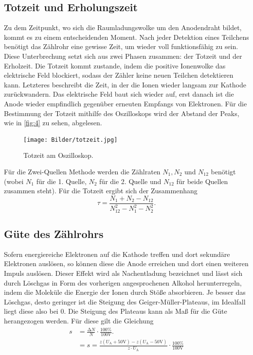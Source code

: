 \subsection{Totzeit und Erholungszeit}
Zu dem Zeitpunkt, wo sich die Raumladungswolke um den Anodendraht bildet, kommt 
es zu einem entscheidenden Moment. Nach jeder Detektion eines Teilchens benötigt
das Zählrohr eine gewisse Zeit, um wieder voll funktionsfähig zu sein. Diese
Unterbrechung setzt sich aus zwei Phasen zusammen: der Totzeit und der Erholzeit.
Die Totzeit kommt zustande, indem die positive Ionenwolke das elektrische Feld 
blockiert, sodass der Zähler keine neuen Teilchen detektieren kann. Letzteres 
beschreibt die Zeit, in der die Ionen wieder langsam zur Kathode zurückwandern. 
Das elektrische Feld baut sich wieder auf, erst danach ist die Anode wieder 
empfindlich gegenüber erneuten Empfangs von Elektronen. Für die Bestimmung der 
Totzeit mithilfe des Oszilloskops wird der Abstand der Peaks, wie in \autoref{fig:4}
zu sehen, abgelesen.
\begin{figure}[H]
    \centering
        \centering
        \texttt{[image: Bilder/totzeit.jpg]}
        \caption{Totzeit am Oszilloskop.}
    \hfill
    \label{fig:3}
\end{figure}
\noindent Für die Zwei-Quellen Methode werden die Zählraten $N_1, N_2$ und 
$N_{12}$ benötigt (wobei $N_1$ für die 1. Quelle, $N_2$ für die 2. Quelle und 
$N_{12}$ für beide Quellen zusammen steht). Für die Totzeit ergibt sich der 
Zusammenhang
\begin{equation}
    \tau = \frac{N_1 + N_2 - N_{12}}{N_{12}^2 - N_1^2 -N_2^2}.
\end{equation}

\subsection{Güte des Zählrohrs}
Sofern energiereiche Elektronen auf die Kathode treffen und dort sekundäre 
Elektronen auslösen, so können diese die Anode erreichen und dort einen 
weiteren Impuls auslösen. Dieser Effekt wird als Nachentladung bezeichnet und 
lässt sich durch Löschgas in Form des vorherigen angesprochenen Alkohol 
herunterregeln, indem die Moleküle die Energie der Ionen durch Stöße absorbieren.
Je besser das Löschgas, desto geringer ist die Steigung des Geiger-Müller-Plateaus, 
im Idealfall liegt diese also bei 0. Die Steigung des Plateaus kann als Maß 
für die Güte herangezogen werden. Für diese gilt die Gleichung 
\begin{align}
    s &= \frac{\increment N}{N} \cdot \frac{100\%}{100V}.\\
      &= s = \frac{z\left(U_\text{A} + 50\unit{\volt}\right) - z\left(U_\text{A} - 50\unit{\volt}\right)}{z \cdot U_\text{A}} \cdot \frac{100\%}{100\unit{\volt}}
\end{align} 

